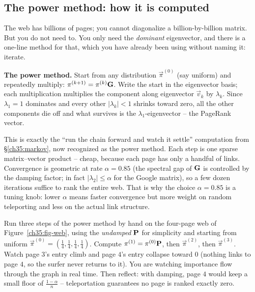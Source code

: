 \subsection{The power method: how it is computed}

The web has billions of pages; you cannot diagonalize a billion-by-billion matrix. But you
do not need to. You only need the \emph{dominant} eigenvector, and there is a one-line
method for that, which you have already been using without naming it: iterate.

\begin{intuitionbox}
\textbf{The power method.} Start from any distribution $\vec\pi^{(0)}$ (say uniform) and
repeatedly multiply: $\mathbf{\pi}^{(k+1)} = \mathbf{\pi}^{(k)}\mathbf{G}$. Write the start in the
eigenvector basis; each multiplication multiplies the component along eigenvector
$\vec{v}_k$ by $\lambda_k$. Since $\lambda_1 = 1$ dominates and every other $|\lambda_k| < 1$
shrinks toward zero, all the other components die off and what survives is the
$\lambda_1$-eigenvector -- the PageRank vector.
\end{intuitionbox}

This is exactly the ``run the chain forward and watch it settle'' computation from
\S\ref{ch35:markov}, now recognized as the power method. Each step is one sparse
matrix--vector product -- cheap, because each page has only a handful of links. Convergence
is geometric at rate $\alpha = 0.85$ (the spectral gap of $\mathbf{G}$ is controlled by the
damping factor; in fact $|\lambda_2| \le \alpha$ for the Google matrix), so a few dozen
iterations suffice to rank the entire web. That is why the choice $\alpha = 0.85$ is a
tuning knob: lower $\alpha$ means faster convergence but more weight on random teleporting
and less on the actual link structure.

\begin{labbox}
Run three steps of the power method by hand on the four-page web of
Figure~\ref{ch35:fig-web}, using the \emph{undamped} $\mathbf{P}$ for simplicity and starting
from uniform $\vec\pi^{(0)} = (\tfrac14,\tfrac14,\tfrac14,\tfrac14)$. Compute
$\mathbf{\pi}^{(1)} = \mathbf{\pi}^{(0)}\mathbf{P}$, then $\vec\pi^{(2)}$, then $\vec\pi^{(3)}$. Watch
page $3$'s entry climb and page $4$'s entry collapse toward $0$ (nothing links to page $4$,
so the surfer never returns to it). You are watching importance flow through the graph in
real time. Then reflect: with damping, page $4$ would keep a small floor of
$\tfrac{1-\alpha}{n}$ -- teleportation guarantees no page is ranked exactly zero.
\end{labbox}

